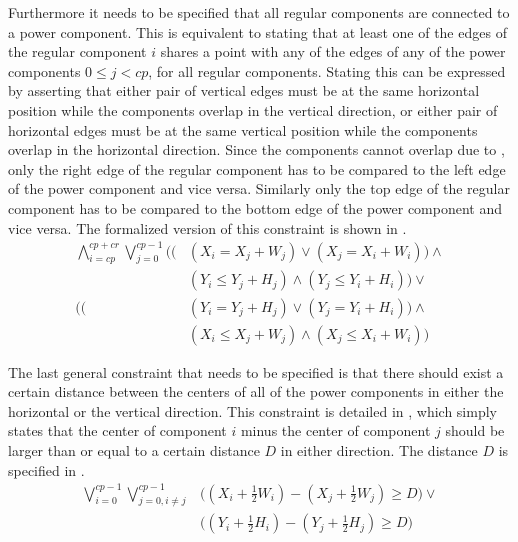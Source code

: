 Furthermore it needs to be specified that all regular components are connected to a power component. This is equivalent to stating that at least one of the edges of the regular component $i$ shares a point with any of the edges of any of the power components $0 \leq j < cp$, for all regular components. Stating this can be expressed by asserting that either pair of vertical edges must be at the same horizontal position while the components overlap in the vertical direction, or either pair of horizontal edges must be at the same vertical position while the components overlap in the horizontal direction. Since the components cannot overlap due to , only the right edge of the regular component has to be compared to the left edge of the power component and vice versa. Similarly only the top edge of the regular component has to be compared to the bottom edge of the power component and vice versa. The formalized version of this constraint is shown in .
\begin{equation}
  \label{eqn:2_power}
  \begin{aligned}
    \bigwedge_{i = cp}^{cp + cr}
      \bigvee_{j = 0}^{cp - 1}
        \Bigg(
          \Big(
           &(X_{i} = X_{j} + W_{j}) \vee
            (X_{j} = X_{i} + W_{i})
          \Big) \wedge \\
         &(Y_{i} \leq Y_{j} + H_{j}) \wedge
          (Y_{j} \leq Y_{i} + H_{i})
        \Bigg) \vee \\
        \Bigg(
          \Big(
           &(Y_{i} = Y_{j} + H_{j}) \vee
            (Y_{j} = Y_{i} + H_{i})
          \Big) \wedge \\
         &(X_{i} \leq X_{j} + W_{j}) \wedge
          (X_{j} \leq X_{i} + W_{i})
        \Bigg)
    \end{aligned}
\end{equation}

The last general constraint that needs to be specified is that there should exist a certain distance between the centers of all of the power components in either the horizontal or the vertical direction. This constraint is detailed in , which simply states that the center of component $i$ minus the center of component $j$ should be larger than or equal to a certain distance $D$ in either direction. The distance $D$ is specified in .
\begin{equation}
  \label{eqn:2_dist}
  \begin{aligned}
    \bigvee_{i = 0}^{cp - 1}
      \bigvee_{j = 0, i \neq j}^{cp - 1}
        &\Big((X_{i} + \frac{1}{2}W_{i}) - (X_{j} + \frac{1}{2}W_{j}) \geq D\Big) \vee \\
        &\Big((Y_{i} + \frac{1}{2}H_{i}) - (Y_{j} + \frac{1}{2}H_{j}) \geq D\Big)
  \end{aligned}
\end{equation}

